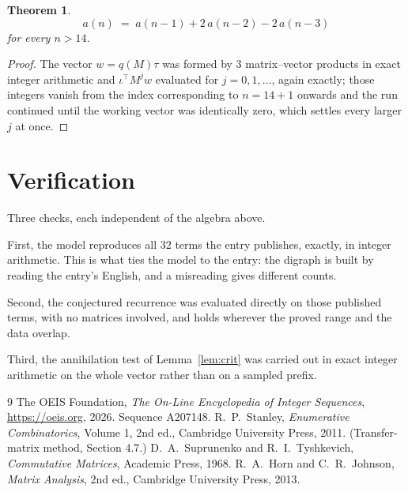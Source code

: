 \documentclass[11pt,a4paper]{article}
\theoremstyle{plain}
\newtheorem{theorem}{Theorem}
\theoremstyle{definition}
\begin{document}
\begin{theorem}
\[
a(n)\;=\;a(n-1) + 2\,a(n-2) - 2\,a(n-3)
\]
for every $n>14$.
\end{theorem}

\begin{proof}
The vector $w=q(M)\tau$ was formed by $3$ matrix--vector products in exact integer
arithmetic and $\iota^{\!\top}M^{j}w$ evaluated for $j=0,1,\dots$, again exactly; those
integers vanish from the index corresponding to $n=14+1$ onwards and the run continued
until the working vector was identically zero, which settles every larger $j$ at once.
\end{proof}

\section{Verification}

Three checks, each independent of the algebra above.

First, the model reproduces all $32$ terms the entry publishes, exactly, in integer
arithmetic. This is what ties the model to the entry: the digraph is built by reading the
entry's English, and a misreading gives different counts.

Second, the conjectured recurrence was evaluated directly on those published terms, with no
matrices involved, and holds wherever the proved range and the data overlap.

Third, the annihilation test of Lemma~\ref{lem:crit} was carried out in exact integer
arithmetic on the whole vector rather than on a sampled prefix.

\begin{thebibliography}{9}
 The OEIS Foundation, \emph{The On-Line Encyclopedia of Integer
Sequences}, \url{https://oeis.org}, 2026. Sequence A207148.
 R.~P.~Stanley, \emph{Enumerative Combinatorics}, Volume 1, 2nd ed.,
Cambridge University Press, 2011. (Transfer-matrix method, Section 4.7.)
 D.~A.~Suprunenko and R.~I.~Tyshkevich, \emph{Commutative Matrices},
Academic Press, 1968.
 R.~A.~Horn and C.~R.~Johnson, \emph{Matrix Analysis}, 2nd ed., Cambridge
University Press, 2013.
\end{thebibliography}
\end{document}
